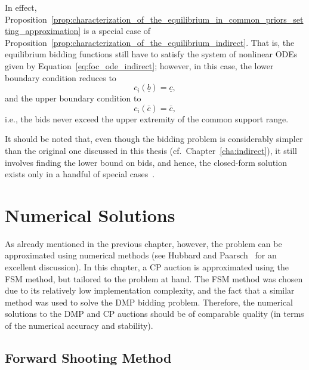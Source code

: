 In effect, Proposition~\ref{prop:characterization_of_the_equilibrium_in_common_priors_setting_approximation} is a special case of Proposition~\ref{prop:characterization_of_the_equilibrium_indirect}. That is, the equilibrium bidding functions still have to satisfy the system of nonlinear ODEs given by Equation~\eqref{eq:foc_ode_indirect}; however, in this case, the lower boundary condition reduces to
\begin{equation*}
  c_i(\underline{b}) = \underline{c},
\end{equation*}
and the upper boundary condition to
\begin{equation*}
  c_i(\bar{c}) = \bar{c},
\end{equation*}
i.e., the bids never exceed the upper extremity of the common support range.

It should be noted that, even though the bidding problem is considerably simpler than the original one discussed in this thesis (cf.~Chapter~\ref{cha:indirect}), it still involves finding the lower bound on bids, and hence, the closed-form solution exists only in a handful of special cases~\cite{Krishna10,HubbardPaarsch2011}.


\section{Numerical Solutions} %
\label{sec:numerical_solutions}
As already mentioned in the previous chapter, however, the problem can be approximated using numerical methods (see Hubbard and Paarsch~\cite{HubbardPaarsch2011} for an excellent discussion). In this chapter, a CP auction is approximated using the FSM method, but tailored to the problem at hand. The FSM method was chosen due to its relatively low implementation complexity, and the fact that a similar method was used to solve the DMP bidding problem. Therefore, the numerical solutions to the DMP and CP auctions should be of comparable quality (in terms of the numerical accuracy and stability).

\subsection{Forward Shooting Method} %
\label{sub:forward_shooting_method}

